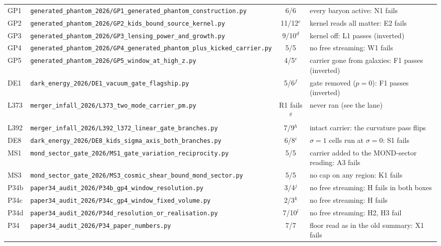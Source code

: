 \documentclass[10pt]{article}
\newcommand{\fpath}[1]{\nolinkurl{#1}}
\begin{document}
{\begin{longtable}{@{}l>{\raggedright\arraybackslash}p{}c>{\raggedright\arraybackslash}p{}@{}}
GP1 & \fpath{generated_phantom_2026/GP1_generated_phantom_construction.py} & 6/6 & every baryon active: N1 fails\\
GP2 & \fpath{generated_phantom_2026/GP2_kids_bound_source_kernel.py} & 11/12$^c$ & kernel reads all matter: E2 fails\\
GP3 & \fpath{generated_phantom_2026/GP3_lensing_power_and_growth.py} & 9/10$^d$ & kernel off: L1 passes (inverted)\\
GP4 & \fpath{generated_phantom_2026/GP4_generated_phantom_plus_kicked_carrier.py} & 5/5 & no free streaming: W1 fails\\
GP5 & \fpath{generated_phantom_2026/GP5_window_at_high_z.py} & 4/5$^e$ & carrier gone from galaxies: F1 passes (inverted)\\
DE1 & \fpath{dark_energy_2026/DE1_vacuum_gate_flagship.py} & 5/6$^f$ & gate removed ($p=0$): F1 passes (inverted)\\
L373 & \fpath{merger_infall_2026/L373_two_mode_carrier_pm.py} & R1 fails$^g$ & never ran (see the lane)\\
L392 & \fpath{merger_infall_2026/L392_l372_linear_gate_branches.py} & 7/9$^h$ & intact carrier: the curvature pass flips\\
DE8 & \fpath{dark_energy_2026/DE8_kids_sigma_axis_both_branches.py} & 6/8$^i$ & $\sigma=1$ cells run at $\sigma=0$: S1 fails\\
MS1 & \fpath{mond_sector_gate_2026/MS1_gate_variation_reciprocity.py} & 5/5 & carrier added to the MOND-sector reading: A3 fails\\
MS3 & \fpath{mond_sector_gate_2026/MS3_cosmic_shear_bound_mond_sector.py} & 5/5 & no cap on any region: K1 fails\\
P34b & \fpath{paper34_audit_2026/P34b_gp4_window_resolution.py} & 3/4$^j$ & no free streaming: H fails in both boxes\\
P34c & \fpath{paper34_audit_2026/P34c_gp4_window_fixed_volume.py} & 2/3$^k$ & no free streaming: H fails\\
P34d & \fpath{paper34_audit_2026/P34d_resolution_or_realisation.py} & 7/10$^l$ & no free streaming: H2, H3 fail\\
P34 & \fpath{paper34_audit_2026/P34_paper_numbers.py} & 7/7 & floor read as in the old summary: X1 fails\\
\bottomrule
\end{longtable}
\vspace{-8pt}

}
\end{document}
